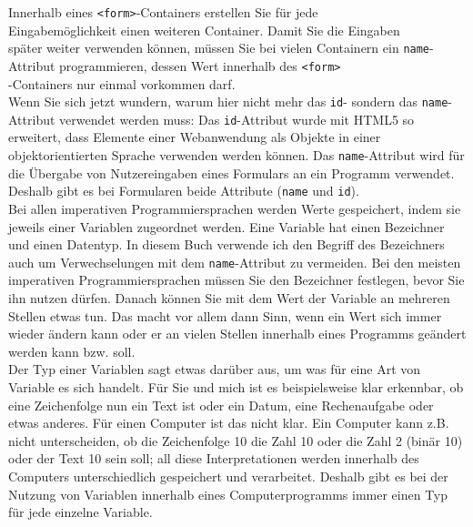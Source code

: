 Innerhalb eines \verb|<form>|-Containers erstellen Sie für jede \\Eingabemöglichkeit einen weiteren Container. Damit Sie die Eingaben \\
später weiter verwenden können, müssen Sie bei vielen Containern ein \verb|name|-Attribut programmieren, dessen Wert innerhalb des \verb|<form>|\\-Containers nur einmal vorkommen darf. \\

Wenn Sie sich jetzt wundern, warum hier nicht mehr das \verb|id|- sondern das \verb|name|-Attribut verwendet werden muss: Das \verb|id|-Attribut wurde mit HTML5 so erweitert, dass Elemente einer Webanwendung als Objekte in einer objektorientierten Sprache verwenden werden können. Das \verb|name|-Attribut wird für die Übergabe von Nutzereingaben eines Formulars an ein Programm verwendet. Deshalb gibt es bei Formularen beide Attribute (\verb|name| und \verb|id|).\\

Bei allen imperativen Programmiersprachen werden Werte gespeichert, indem sie jeweils einer Variablen zugeordnet werden. Eine Variable hat einen Bezeichner und einen Datentyp. In diesem Buch verwende ich den Begriff des Bezeichners auch um Verwechselungen mit dem \verb|name|-Attribut zu vermeiden. Bei den meisten imperativen Programmiersprachen müssen Sie den Bezeichner festlegen, bevor Sie ihn nutzen dürfen. Danach können Sie mit dem Wert der Variable an mehreren Stellen etwas tun. Das macht vor allem dann Sinn, wenn ein Wert sich immer wieder ändern kann oder er an vielen Stellen innerhalb eines Programms geändert werden kann bzw. soll.\\

Der Typ einer Variablen sagt etwas darüber aus, um was für eine Art von Variable es sich handelt. Für Sie und mich ist es beispielsweise klar erkennbar, ob eine Zeichenfolge nun ein Text ist oder ein Datum, eine Rechenaufgabe oder etwas anderes. Für einen Computer ist das nicht klar. Ein Computer kann z.B. nicht unterscheiden, ob die Zeichenfolge 10 die Zahl 10 oder die Zahl 2 (binär 10) oder der Text 10 sein soll; all diese Interpretationen werden innerhalb des Computers unterschiedlich gespeichert und verarbeitet. Deshalb gibt es bei der Nutzung von Variablen innerhalb eines Computerprogramms immer einen Typ für jede einzelne Variable.\\

